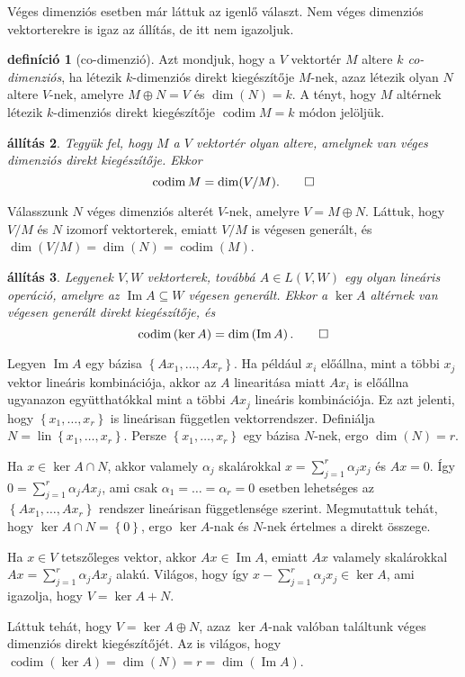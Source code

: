 \documentclass[9pt, a4paper, showtrims]{memoir}
\makeatletter
\renewenvironment{proof}[1][\proofname]
    {\par\pushQED{\qed}%
    \normalfont \topsep6\p@\@plus6\p@\relax
    \trivlist
    \item[\hskip\labelsep
        \itshape
    #1\@addpunct{:}]\ignorespaces}
    {\popQED\endtrivlist\@endpefalse}
\theoremstyle{plain}
\newtheorem{proposition}{állítás}[chapter]
\theoremstyle{remark}
\theoremstyle{definition}
\newtheorem{definition}[proposition]{definíció}
\DeclareMathOperator{\lin}{lin}
\DeclareMathOperator{\codim}{codim}
\DeclareMathOperator{\im}{Im}
\makeatother
\begin{document}
Véges dimenziós esetben már láttuk az igenlő választ.
Nem véges dimenziós vektorterekre is igaz az állítás, de itt nem igazoljuk.
\begin{definition}[co-dimenzió]
	Azt mondjuk, hogy a $V$ vektortér $M$ altere \emph{$k$ co-dimenziós},
	ha létezik $k$-dimenziós direkt kiegészítője $M$-nek,
	azaz létezik olyan $N$ altere $V$-nek, amelyre $M\oplus N=V$
	és $\dim(N)=k$.
	A tényt,
	hogy $M$ altérnek létezik $k$-dimenziós direkt kiegészítője
	$\codim M=k$ módon jelöljük.
\end{definition}
\begin{proposition}
	Tegyük fel, hogy $M$ a $V$ vektortér olyan altere,
	amelynek van véges dimenziós direkt kiegészítője.
	Ekkor
	\[
		\codim M=\dim(V/M).\qedhere
	\]
\end{proposition}
\begin{proof}
	Válasszunk $N$ véges dimenziós alterét $V$-nek,
	amelyre $V=M\oplus N$.
	Láttuk, hogy $V/M$ és $N$ izomorf vektorterek,
	emiatt $V/M$ is végesen generált, és
	$\dim \left( V/M \right)=\dim(N)=\codim(M)$.
\end{proof}
\begin{proposition}
	Legyenek $V,W$ vektorterek,
	továbbá $A\in L\left( V,W \right)$ egy olyan lineáris operáció,
	amelyre az $\im A\subseteq W$ végesen generált.
	Ekkor a $\ker A$ altérnek van végesen generált direkt kiegészítője, és
	\[
		\codim\left( \ker A \right)=\dim\left( \im A \right).\qedhere
	\]
\end{proposition}
\begin{proof}
	Legyen $\im A$ egy bázisa $\left\{ Ax_1,\ldots,Ax_r \right\}$.
    Ha például $x_i$ előállna, mint a többi $x_j$ vektor lineáris kombinációja,
    akkor az $A$ linearitása miatt $Ax_i$ is előállna ugyanazon együtthatókkal mint a többi $Ax_j$
    lineáris kombinációja.
    Ez azt jelenti, hogy $\left\{ x_1,\ldots,x_r \right\}$ is lineárisan független vektorrendszer.
	Definiálja $N=\lin\left\{ x_1,\ldots,x_r \right\}$.
    Persze $\left\{ x_1,\ldots,x_r \right\}$ egy bázisa $N$-nek,
    ergo $\dim(N)=r$.

	Ha $x\in\ker A\cap N$, akkor valamely $\alpha_j$ skalárokkal
	$x=\sum_{j=1}^r\alpha_jx_j$ és $Ax=0$.
	Így $0=\sum_{j=1}^r\alpha_jAx_j$, ami csak $\alpha_1=\dots=\alpha_r=0$
	esetben lehetséges az $\left\{ Ax_1,\ldots,Ax_r \right\}$ rendszer lineárisan függetlensége szerint.
    Megmutattuk tehát, hogy $\ker A\cap N=\left\{ 0 \right\}$, ergo $\ker A$-nak és $N$-nek értelmes a direkt összege.

	Ha $x\in V$ tetszőleges vektor, akkor $Ax\in\im A$, emiatt
	$Ax$ valamely skalárokkal $Ax=\sum_{j=1}^r\alpha_jAx_j$ alakú.
	Világos, hogy így $x-\sum_{j=1}^r\alpha_jx_j\in\ker A$,
	ami igazolja, hogy $V=\ker A+N$.

	Láttuk tehát, hogy $V=\ker A\oplus N$, azaz $\ker A$-nak valóban találtunk véges dimenziós direkt kiegészítőjét.
	Az is világos, hogy $\codim\left( \ker A \right)=\dim(N)=r=\dim\left( \im A \right)$.
\end{proof}
\end{document}
